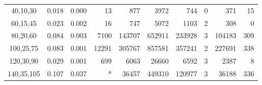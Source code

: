 \documentclass[smallextended]{svjour3hack}       %
\begin{document}
\begin{table}[!ht]
\begin{tabular}{c|r|r|r|r|r|r|r|rr}
40,10,30            & 0.018                                     & 0.000                                & 13                                          & 877                                       & 3972                                     & 744                                       & 0                                       & 371                                       & 15                                        \\
60,15,45            & 0.023                                     & 0.002                                & 16                                          & 747                                       & 5072                                     & 1103                                      & 2                                       & 308                                       & 0                                         \\
80,20,60            & 0.084                                     & 0.003                                & 7100                                        & 143707                                    & 652911                                   & 233928                                    & 3                                       & 104183                                    & 309                                       \\
100,25,75           & 0.083                                     & 0.001                                & 12291                                       & 305767                                    & 857581                                   & 357241                                    & 2                                       & 227691                                    & 338                                       \\
120,30,90           & 0.029                                     & 0.001                                & 699                                         & 6063                                      & 26660                                    & 6592                                      & 3                                       & 2387                                      & 8                                         \\
140,35,105          & 0.107                                     & 0.037                                & *                                           & 36457                                     & 449310                                   & 120977                                    & 3                                       & 36188                                     & 336                                       \\

\end{tabular}
\end{table}
\end{document}

